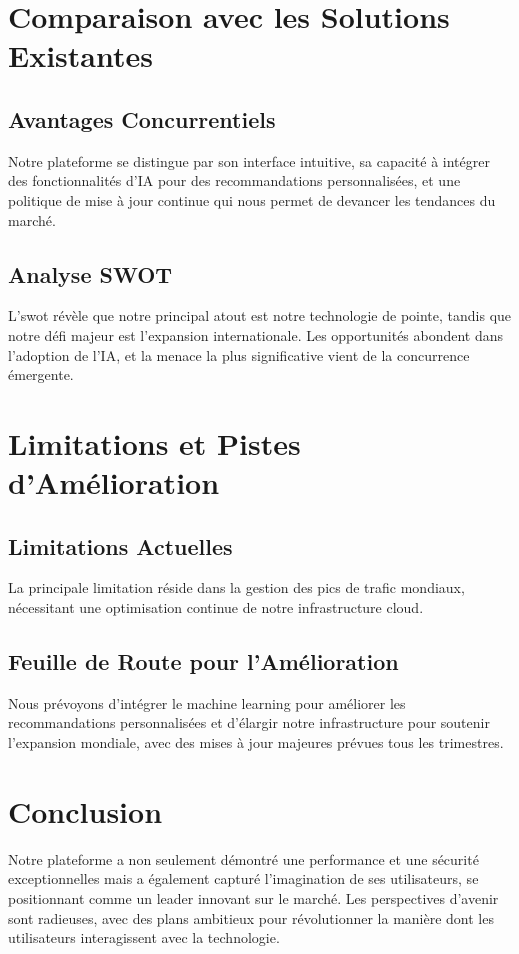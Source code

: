 \section{Comparaison avec les Solutions Existantes}

\subsection{Avantages Concurrentiels}
Notre plateforme se distingue par son interface intuitive, sa capacité à intégrer des fonctionnalités d'IA pour des recommandations personnalisées, et une politique de mise à jour continue qui nous permet de devancer les tendances du marché.

\subsection{Analyse SWOT}
L'\gls{swot} révèle que notre principal atout est notre technologie de pointe, tandis que notre défi majeur est l'expansion internationale. Les opportunités abondent dans l'adoption de l'IA, et la menace la plus significative vient de la concurrence émergente.

\section{Limitations et Pistes d'Amélioration}

\subsection{Limitations Actuelles}
La principale limitation réside dans la gestion des pics de trafic mondiaux, nécessitant une optimisation continue de notre infrastructure cloud.

\subsection{Feuille de Route pour l'Amélioration}
Nous prévoyons d'intégrer le machine learning pour améliorer les recommandations personnalisées et d'élargir notre infrastructure pour soutenir l'expansion mondiale, avec des mises à jour majeures prévues tous les trimestres.

\section{Conclusion}

Notre plateforme a non seulement démontré une performance et une sécurité exceptionnelles mais a également capturé l'imagination de ses utilisateurs, se positionnant comme un leader innovant sur le marché. Les perspectives d'avenir sont radieuses, avec des plans ambitieux pour révolutionner la manière dont les utilisateurs interagissent avec la technologie.

